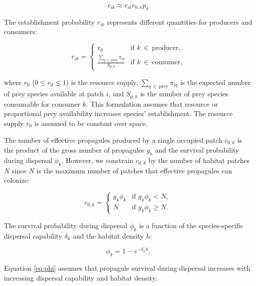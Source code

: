 \documentclass[11pt, class=article, crop=false]{standalone}
\begin{document}
\begin{equation}
     c_{ik} \approx r_{ik} c_{0, k} p_k
\end{equation}

The establishment probability $r_{ik}$ represents different quantities for producers and consumers:

\begin{equation}
    r_{ik} =
    \begin{cases}
    r_{0} & \text{if $k~\in~\text{producer}$,}\\
    \frac{\sum_{q~\in~\text{prey}} \pi_{iq}}{S_{p, k}} & \text{if $k~\in~\text{consumer}$,}
    \end{cases}
    \label{eq:r-eq}
\end{equation}

where $r_0$ ($0 \le r_0 \le 1$) is the resource supply, $\sum_{q~\in~\text{prey}} \pi_{iq}$ is the expected number of prey species available at patch $i$, and $S_{p, k}$ is the number of prey species consumable for consumer $k$.
This formulation assumes that resource or proportional prey availability increases species' establishment.
The resource supply $r_0$ is assumed to be constant over space.

The number of effective propagules produced by a single occupied patch $c_{0, k}$ is the product of the gross number of propagules $g_{k}$ and the survival probability during dispersal $\phi_k$.
However, we constrain $c_{0, k}$ by the number of habitat patches $N$ since $N$ is the maximum number of patches that effective propagules can colonize:

\begin{equation}
    c_{0, k} = 
    \begin{cases}
        g_k \phi_k & \text{if $g_k \phi_k < N$},\\
        N & \text{if $g_k \phi_k \ge N$}.
    \end{cases}
    \label{eq:c0-prod}
\end{equation}

The survival probability during dispersal $\phi_k$ is a function of the species-specific dispersal capability $\delta_k$ and the habitat density $h$:

\begin{equation}
    \phi_k = 1 - e^{-\delta_k h}.
    \label{eq:phi}
\end{equation}

Equation \ref{eq:phi} assumes that propagule survival during dispersal increases with increasing dispersal capability and habitat density.
\end{document}
